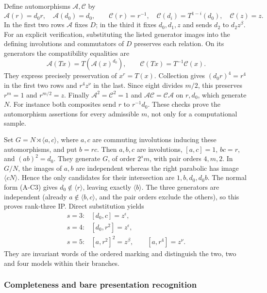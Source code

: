 \documentclass[
  11pt,
  a4paper,
]{article}
\begin{document}
Define automorphisms \(\mathcal A,\mathcal C\) by \[
 \mathcal A(r)=d_0r,\quad \mathcal A(d_0)=d_0,\qquad
 \mathcal C(r)=r^{-1},\quad
 \mathcal C(d_i)=T^{1-i}(d_0),\quad\mathcal C(z)=z.
\] In the first two rows \(\mathcal A\) fixes \(D\); in the third it
fixes \(d_0,d_1,z\) and sends \(d_2\) to \(d_2z^\beta\). For an explicit
verification, substituting the listed generator images into the defining
involutions and commutators of \(D\) preserves each relation. On its
generators the compatibility equalities are \[
 \mathcal A(Tx)=T(\mathcal A(x)^{d_0}),\qquad
 \mathcal C(Tx)=T^{-1}\mathcal C(x).
\] They express precisely preservation of \(x^r=T(x)\). Collection gives
\((d_0r)^4=r^4\) in the first two rows and \(r^4z^\nu\) in the last.
Since eight divides \(m/2\), this preserves \(r^m=1\) and \(r^{m/2}=z\).
Finally \(\mathcal A^2=\mathcal C^2=1\) and
\(\mathcal A\mathcal C=\mathcal C\mathcal A\) on \(r,d_0\), which
generate \(N\). For instance both composites send \(r\) to
\(r^{-1}d_0\). These checks prove the automorphism assertions for every
admissible \(m\), not only for a computational sample.

Set \(G=N\rtimes\langle a,c\rangle\), where \(a,c\) are commuting
involutions inducing these automorphisms, and put \(b=rc\). Then
\(a,b,c\) are involutions, \([a,c]=1\), \(bc=r\), and \((ab)^2=d_0\).
They generate \(G\), of order \(2^s m\), with pair orders \(4,m,2\). In
\(G/N\), the images of \(a,b\) are independent whereas the right
parabolic has image \(\langle cN\rangle\). Hence the only candidates for
their intersection are \(1,b,d_0,d_0b\). The normal form (A-C3) gives
\(d_0\notin\langle r\rangle\), leaving exactly \(\langle b\rangle\). The
three generators are independent (already \(a\notin\langle b,c\rangle\),
and the pair orders exclude the others), so this proves rank-three IP.
Direct substitution yields \[
 \begin{array}{ll}
 s=3:&[d_0,c]=z^\epsilon,\\
 s=4:&[d_0,r^2]=z^\epsilon,\\
 s=5:&[a,r^2]^2=z^\beta,\qquad[a,r^4]=z^\nu.
 \end{array}                                                   \tag{A-C4}
\] They are invariant words of the ordered marking and distinguish the
two, two and four models within their branches.

\subsubsection{Completeness and bare presentation
recognition}\label{completeness-and-bare-presentation-recognition}
\end{document}
